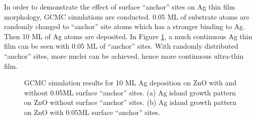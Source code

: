 In order to demonstrate the effect of surface ``anchor'' sites on Ag thin film morphology, \ac{GCMC} simulations are conducted. 0.05 \ac{ML} of substrate atoms are randomly changed to ``anchor'' site atoms which has a stronger binding to Ag. Then 10 \ac{ML} of Ag atoms are deposited. In Figure \ref{Chap:Ag/ZnO:fig14}, a much continuous Ag thin film can be seen with 0.05 \ac{ML} of ``anchor'' sites. With randomly distributed ``anchor'' sites, more nuclei can be achieved, hence more continuous ultra-thin film.

\newpage
\begingroup
\begin{figure}[!ht]
  \centering
  \label{Chap:Ag/ZnO:fig:14a}
  \label{Chap:Ag/ZnO:fig:14b}
\caption[GCMC simulation results for 10 \ac{ML} Ag deposition on ZnO with and without 0.05\ac{ML} surface ``anchor'' sites.]{\ac{GCMC} simulation results for 10 \ac{ML} Ag deposition on ZnO with and without 0.05\ac{ML} surface ``anchor'' sites. (a) Ag island growth pattern on ZnO without surface ``anchor'' sites. (b) Ag island growth pattern on ZnO with 0.05\ac{ML} surface ``anchor'' sites.}
\label{Chap:Ag/ZnO:fig14}
\end{figure}
\endgroup